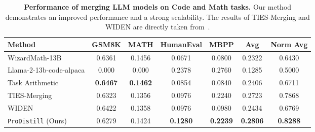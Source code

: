 \begin{table*}[t]
\centering
\caption{\textbf{Performance of merging LLM models on Code and Math tasks.} Our method demonstrates an improved performance and a strong scalability. The results of TIES-Merging and WIDEN are directly taken from~\citet{yu2024extend}.}
\begin{tabular}{l|cccc|cc}
\toprule
\textbf{Method} & \textbf{GSM8K} & \textbf{MATH} & \textbf{HumanEval} & \textbf{MBPP} & \textbf{Avg} & \textbf{Norm Avg} \\

\midrule
WizardMath-13B & 0.6361 & 0.1456 & 0.0671 & 0.0800 & 0.2322 & 0.6430 \\
Llama-2-13b-code-alpaca & 0.000 & 0.000 & 0.2378 & 0.2760 & 0.1285 & 0.5000 \\
\midrule
Task Arithmetic & \textbf{0.6467} & \textbf{0.1462} & 0.0854 & 0.0840 & 0.2406 & 0.6711\\
TIES-Merging & 0.6323 & 0.1356 & 0.0976 & 0.2240 & 0.2723 & 0.7868\\
WIDEN & 0.6422 & 0.1358 & 0.0976 & 0.0980 & 0.2434 & 0.6769\\
\rowcolor{lightyellow}
\texttt{ProDistill} (Ours) & 0.6279 & 0.1424 & \textbf{0.1280} & \textbf{0.2239} & \textbf{0.2806} & \textbf{0.8288}\\
\bottomrule
\end{tabular}
\label{tab: code_math}
\end{table*}